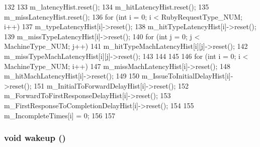 \begin{DoxyCode}
132 {
133     m_latencyHist.reset();
134     m_hitLatencyHist.reset();
135     m_missLatencyHist.reset();
136     for (int i = 0; i < RubyRequestType_NUM; i++) {
137         m_typeLatencyHist[i]->reset();
138         m_hitTypeLatencyHist[i]->reset();
139         m_missTypeLatencyHist[i]->reset();
140         for (int j = 0; j < MachineType_NUM; j++) {
141             m_hitTypeMachLatencyHist[i][j]->reset();
142             m_missTypeMachLatencyHist[i][j]->reset();
143         }
144     }
145 
146     for (int i = 0; i < MachineType_NUM; i++) {
147         m_missMachLatencyHist[i]->reset();
148         m_hitMachLatencyHist[i]->reset();
149 
150         m_IssueToInitialDelayHist[i]->reset();
151         m_InitialToForwardDelayHist[i]->reset();
152         m_ForwardToFirstResponseDelayHist[i]->reset();
153         m_FirstResponseToCompletionDelayHist[i]->reset();
154 
155         m_IncompleteTimes[i] = 0;
156     }
157 }
\end{DoxyCode}
\hypertarget{classSequencer_ae674290a26ecbd622c5160e38e8a4fe9}{
\subsubsection[{wakeup}]{\setlength{\rightskip}{0pt plus 5cm}void wakeup ()}}
\label{classSequencer_ae674290a26ecbd622c5160e38e8a4fe9}



